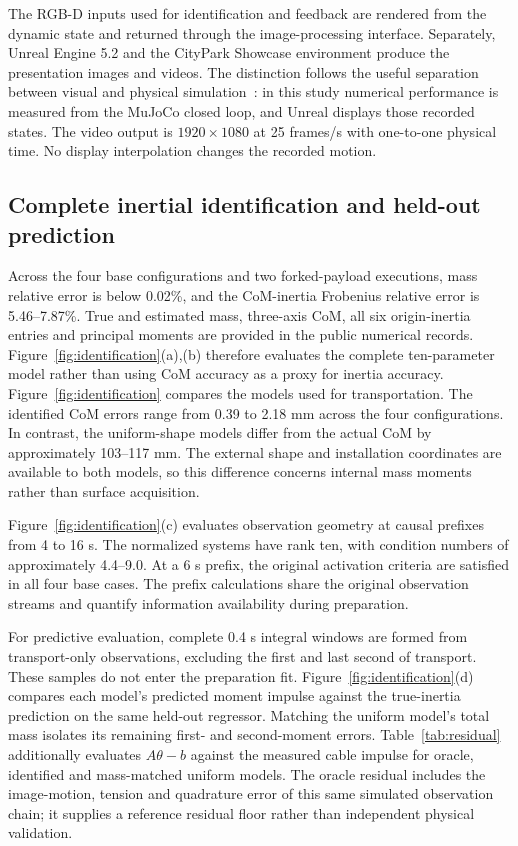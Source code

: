 The RGB-D inputs used for identification and feedback are rendered from the dynamic state and returned through the image-processing interface. Separately, Unreal Engine 5.2 and the CityPark Showcase environment produce the presentation images and videos. The distinction follows the useful separation between visual and physical simulation~\cite{airsim2017}: in this study numerical performance is measured from the MuJoCo closed loop, and Unreal displays those recorded states. The video output is $1920\times1080$ at 25 frames/s with one-to-one physical time. No display interpolation changes the recorded motion.

\subsection{Complete inertial identification and held-out prediction}
Across the four base configurations and two forked-payload executions, mass relative error is below 0.02\%, and the CoM-inertia Frobenius relative error is 5.46--7.87\%. True and estimated mass, three-axis CoM, all six origin-inertia entries and principal moments are provided in the public numerical records. Figure~\ref{fig:identification}(a),(b) therefore evaluates the complete ten-parameter model rather than using CoM accuracy as a proxy for inertia accuracy. 
Figure~\ref{fig:identification} compares the models used for transportation. The identified CoM errors range from 0.39 to 2.18 mm across the four configurations. In contrast, the uniform-shape models differ from the actual CoM by approximately 103--117 mm. The external shape and installation coordinates are available to both models, so this difference concerns internal mass moments rather than surface acquisition.

Figure~\ref{fig:identification}(c) evaluates observation geometry at causal prefixes from 4 to 16 s. The normalized systems have rank ten, with condition numbers of approximately 4.4--9.0. At a 6 s prefix, the original activation criteria are satisfied in all four base cases. The prefix calculations share the original observation streams and quantify information availability during preparation.

For predictive evaluation, complete 0.4 s integral windows are formed from transport-only observations, excluding the first and last second of transport. These samples do not enter the preparation fit. Figure~\ref{fig:identification}(d) compares each model's predicted moment impulse against the true-inertia prediction on the same held-out regressor. Matching the uniform model's total mass isolates its remaining first- and second-moment errors. Table~\ref{tab:residual} additionally evaluates $A\theta-b$ against the measured cable impulse for oracle, identified and mass-matched uniform models. The oracle residual includes the image-motion, tension and quadrature error of this same simulated observation chain; it supplies a reference residual floor rather than independent physical validation.

